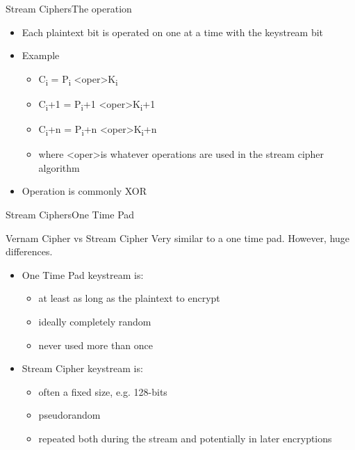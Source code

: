 \documentclass[12pt]{beamer}
\begin{document}
\begin{frame}{Stream Ciphers}{The operation}
\begin{block}{}
\begin{itemize}
	\item Each plaintext bit is operated on one at a time with the keystream bit
	\item Example
	\begin{itemize}
		\item C\textsubscript i = P\textsubscript i \textless oper\textgreater  K\textsubscript i
		\item C\textsubscript i+1 = P\textsubscript i+1 \textless oper\textgreater  K\textsubscript i+1
		\item C\textsubscript i+n = P\textsubscript i+n \textless oper\textgreater  K\textsubscript i+n
		\item where \textless oper\textgreater is whatever operations are used in the stream cipher algorithm
	\end{itemize}
	\item Operation is commonly XOR
\end{itemize}
\end{block}
\end{frame}

\begin{frame}{Stream Ciphers}{One Time Pad}
\begin{block}{Vernam Cipher vs Stream Cipher}
Very similar to a one time pad. However, huge differences.
\begin{itemize}
	\item One Time Pad keystream is:
	\begin{itemize}
		\item at least as long as the plaintext to encrypt
		\item ideally completely random
		\item never used more than once
	\end{itemize}
	\item Stream Cipher keystream is:
	\begin{itemize}
		\item often a fixed size, e.g. 128-bits
		\item pseudorandom 
		\item repeated both during the stream and potentially in later encryptions
	\end{itemize}
\end{itemize}
\end{block}
\end{frame}
\end{document}
